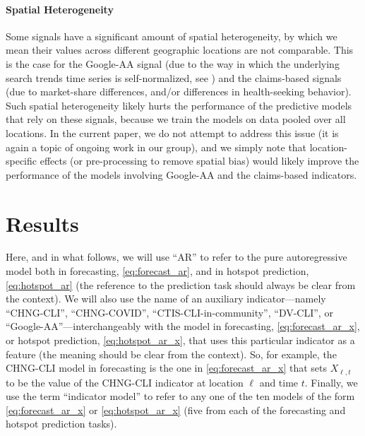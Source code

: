 \documentclass[9pt,twocolumn,twoside,lineno]{pnas-new}
\begin{document}
\paragraph{Spatial Heterogeneity} 

Some signals have a significant amount of spatial heterogeneity, by which we
mean their values across different geographic locations are not comparable.
This is the case for the Google-AA signal (due to the way in which the
underlying search trends time series is self-normalized, see
\cite{GoogleSymptoms}) and the claims-based signals (due to market-share 
differences, and/or differences in health-seeking behavior).  Such spatial
heterogeneity likely hurts the performance of the predictive models that rely on
these signals, because we train the models on data pooled over all locations.
In the current paper, we do not attempt to address this issue (it is again a
topic of ongoing work in our group), and we simply note that location-specific
effects (or pre-processing to remove spatial bias) would likely improve the
performance of the models involving Google-AA and the claims-based indicators.

\section{Results}

Here, and in what follows, we will use ``AR'' to refer to the pure 
autoregressive model both in forecasting, \eqref{eq:forecast_ar}, and in hotspot
prediction, \eqref{eq:hotspot_ar} (the reference to the prediction task should
always be clear from the context). We will also use the name of an auxiliary 
indicator---namely ``CHNG-CLI'',  ``CHNG-COVID'', ``CTIS-CLI-in-community'',
``DV-CLI'', or ``Google-AA''---interchangeably with the model in forecasting, 
\eqref{eq:forecast_ar_x}, or hotspot prediction, \eqref{eq:hotspot_ar_x}, that
uses this particular indicator as a feature (the meaning should be clear from
the context).  So, for example, the CHNG-CLI model in forecasting is the one in  
\eqref{eq:forecast_ar_x} that sets $X_{\ell,t}$ to be the value of the CHNG-CLI 
indicator at location $\ell$ and time $t$.
Finally, we use the term ``indicator model'' to refer to any one of the ten
models of the form \eqref{eq:forecast_ar_x} or \eqref{eq:hotspot_ar_x} (five
from each of the forecasting and hotspot prediction tasks).
\end{document}
